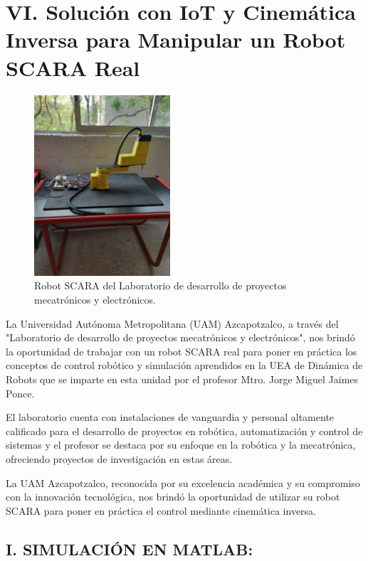 \documentclass[final]{foresj}
\begin{document}
\section{VI. Solución con IoT y Cinemática Inversa para Manipular un Robot SCARA Real}

\begin{figure}[h!]
\centering
\includegraphics[width=0.45\textwidth]{SCARA1.jpg}
\caption{Robot SCARA del Laboratorio de desarrollo de proyectos mecatrónicos y electrónicos.}
\label{fig:my_label}
\end{figure}

La Universidad Autónoma Metropolitana (UAM) Azcapotzalco, a través del "Laboratorio de desarrollo de proyectos mecatrónicos y electrónicos", nos brindó la oportunidad de trabajar con un robot SCARA real para poner en práctica los conceptos de control robótico y simulación aprendidos en la UEA de Dinámica de Robots que se imparte en esta unidad por el profesor Mtro. Jorge Miguel Jaimes Ponce. 


El laboratorio cuenta con instalaciones de vanguardia y personal altamente calificado para el desarrollo de proyectos en robótica, automatización y control de sistemas y el profesor se destaca por su enfoque en la robótica y la mecatrónica, ofreciendo proyectos de investigación en estas áreas.

La UAM Azcapotzalco, reconocida por su excelencia académica y su compromiso con la innovación tecnológica, nos brindó la oportunidad de utilizar su robot SCARA para poner en práctica el control mediante cinemática inversa.

\subsection{I. SIMULACIÓN EN MATLAB:}
\end{document}
